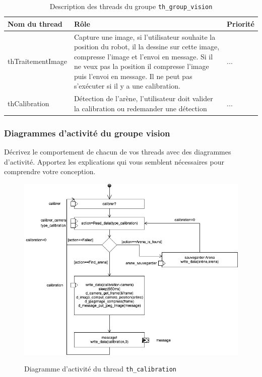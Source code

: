 \documentclass[11pt, a4paper]{paper}
\begin{document}
\begin{table}[htp]
\caption{Description des threads du groupe {\tt th\_group\_vision}}
\begin{center}
\begin{tabular}{|p{3cm}|p{8.5cm}|p{2cm}|}
\hline
\bf Nom du thread &	\bf Rôle &	\bf Priorité \\
\hline
\hline
\color{black}thTraitementImage &	\color{black}Capture une image, si l'utilisateur souhaite la position du robot, il la dessine sur cette image, compresse l'image et l'envoi en message. Si il ne veux pas la position il compresse l'image puis l'envoi en message. Il ne peut pas s'exécuter si il y a une calibration. &	\color{blue}...\\
\hline
\color{black}thCalibration &	\color{black}Détection de l'arène, l'utilisateur doit valider la calibration ou redemander une détection &	\color{blue}...\\
\hline
\end{tabular}
\end{center}
\label{tab:gt_moniteur}
\end{table}%
\FloatBarrier

\subsubsection{Diagrammes d'activité du groupe vision}
{\color{blue}Décrivez le comportement de chacun de vos threads avec des diagrammes d'activité. Apportez les explications qui vous semblent nécessaires pour comprendre votre conception.}

\begin{figure}[htbp]
\label{fig:act_calibration}
\begin{center}
{\includegraphics[scale=.4]{./figures/calibration}}
{\caption{Diagramme d'activité du thread {\tt th\_calibration}}}
\end{center}
\end{figure}
\FloatBarrier
\end{document}
